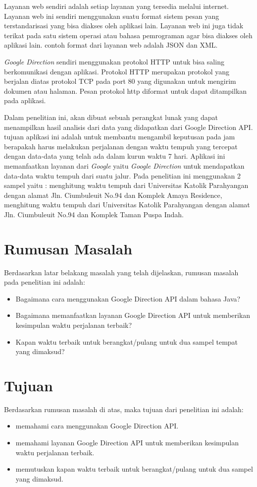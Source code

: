 Layanan web sendiri adalah setiap layanan yang tersedia melalui internet. Layanan web ini sendiri menggunakan suatu format sistem pesan yang terstandarisasi yang bisa diakses oleh aplikasi lain. Layanan web ini juga tidak terikat pada satu sistem operasi atau bahasa pemrograman agar bisa diakses oleh aplikasi lain. contoh format dari layanan web adalah JSON dan XML.

\textit{Google Direction} sendiri menggunakan protokol HTTP untuk bisa saling berkomunikasi dengan aplikasi. Protokol HTTP merupakan protokol yang berjalan diatas protokol TCP pada port 80 yang digunakan untuk mengirim dokumen atau halaman. Pesan protokol http diformat untuk dapat ditampilkan pada aplikasi.

Dalam penelitian ini, akan dibuat sebuah perangkat lunak yang dapat menampilkan hasil analisis dari data yang didapatkan dari Google Direction API. tujuan aplikasi ini adalah untuk membantu mengambil keputusan pada jam berapakah harus melakukan perjalanan dengan waktu tempuh yang tercepat dengan data-data yang telah ada dalam kurun waktu 7 hari. Aplikasi ini memanfaatkan layanan dari \textit{Google} yaitu \textit{Google Direction} untuk mendapatkan data-data waktu tempuh dari suatu jalur. Pada penelitian ini menggunakan 2 sampel yaitu : menghitung waktu tempuh dari Universitas Katolik Parahyangan dengan alamat Jln. Ciumbuleuit No.94 dan Komplek Amaya Residence, menghitung waktu tempuh dari Universitas Katolik Parahyangan dengan alamat Jln. Ciumbuleuit No.94 dan Komplek Taman Puspa Indah.

\section{Rumusan Masalah}
\label{sec:rumusan}
Berdasarkan latar belakang masalah yang telah dijelaskan, rumusan masalah pada penelitian ini adalah:
\begin{itemize}
	\item Bagaimana cara menggunakan Google Direction API dalam bahasa Java?
	\item Bagaimana memanfaatkan layanan Google Direction API untuk memberikan kesimpulan waktu perjalanan terbaik?
	\item Kapan waktu terbaik untuk berangkat/pulang untuk dua sampel tempat yang dimaksud?
\end{itemize}

\section{Tujuan}
\label{sec:tujuan}
Berdasarkan rumusan masalah di atas, maka tujuan dari penelitian ini adalah:
\begin{itemize}
	\item memahami cara menggunakan Google Direction API.
	\item memahami layanan Google Direction API untuk memberikan kesimpulan waktu perjalanan terbaik.
	\item memutuskan kapan waktu terbaik untuk berangkat/pulang untuk dua sampel yang dimaksud.
\end{itemize}

